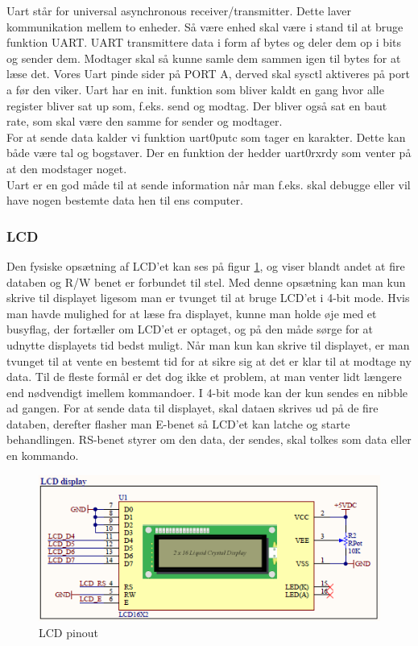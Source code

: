 Uart står for universal asynchronous receiver/transmitter. Dette laver kommunikation mellem to enheder. Så være enhed skal være i stand til at bruge funktion UART. UART transmittere data i form af bytes og deler dem op i bits og sender dem. Modtager skal så kunne samle dem sammen igen til bytes for at læse det.
Vores Uart pinde sider på PORT A, derved skal sysctl aktiveres på port a før den viker. Uart har en init. funktion som bliver kaldt en gang hvor alle register bliver sat up som, f.eks. send og modtag. Der bliver også sat en baut rate, som skal være den samme for sender og modtager.
\\
For at sende data kalder vi funktion uart0\textunderscore putc som tager en karakter. Dette kan både være tal og bogstaver. Der en funktion der hedder uart0\textunderscore rx\textunderscore rdy som venter på at den modstager noget.
\\
Uart er en god måde til at sende information når man f.eks. skal debugge eller vil have nogen bestemte data hen til ens computer.

\subsubsection{LCD}

Den fysiske opsætning af LCD'et kan ses på figur \ref{fig:LCD}, og viser blandt andet at fire databen og R/W benet er forbundet til stel. Med denne opsætning kan man kun skrive til displayet ligesom man er tvunget til at bruge LCD'et i 4-bit mode. Hvis man havde mulighed for at læse fra displayet, kunne man holde øje med et busyflag, der fortæller om LCD'et er optaget, og på den måde sørge for at udnytte displayets tid bedst muligt. Når man kun kan skrive til displayet, er man tvunget til at vente en bestemt tid for at sikre sig at det er klar til at modtage ny data. Til de fleste formål er det dog ikke et problem, at man venter lidt længere end nødvendigt imellem kommandoer. I 4-bit mode kan der kun sendes en nibble ad gangen. For at sende data til displayet, skal dataen skrives ud på de fire databen, derefter flasher man E-benet så LCD'et kan latche og starte behandlingen. RS-benet styrer om den data, der sendes, skal tolkes som data eller en kommando. 

\begin{figure}[ht]
			\begin{center}
			\includegraphics[scale=0.9]{Billeder/LCD.PNG}
			\end{center}
			\caption{LCD pinout}
			\label{fig:LCD}
\end{figure}

